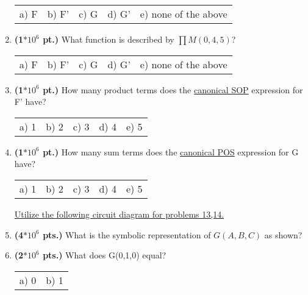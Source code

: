 \documentclass{article}
\begin{document}
\begin{enumerate}
\begin{tabular}{p{0.7in} p{0.7in} p{0.7in} p{0.7in} l}
a) F & b) F' & c) G & d) G' & e) none of the above
\end{tabular}

\item {\bf (1$*10^6$ pt.)} What function is described by $\prod M(0,4,5)$?

\begin{tabular}{p{0.7in} p{0.7in} p{0.7in} p{0.7in} l}
a) F & b) F' & c) G & d) G' & e) none of the above
\end{tabular}


\item {\bf (1$*10^6$ pt.)} How many product terms does the \underline{canonical SOP} expression 
for F' have?

\begin{tabular}{p{0.7in} p{0.7in} p{0.7in} p{0.7in} l}
a) 1 & b) 2 & c) 3 & d) 4 & e) 5
\end{tabular}

\item {\bf (1$*10^6$ pt.)} How many sum terms does the \underline{canonical POS} expression for G have?

\begin{tabular}{p{0.7in} p{0.7in} p{0.7in} p{0.7in} l}
a) 1 & b) 2 & c) 3 & d) 4 & e) 5
\end{tabular}
\pagebreak

\underline{Utilize the following circuit diagram for problems 13,14.}

\begin{figure}[ht]
\end{figure}

\item {\bf (4$*10^6$ pts.)} What is the symbolic representation of $G(A,B,C)$ as shown?

\item {\bf (2$*10^6$ pts.)} What does G(0,1,0) equal?

\begin{tabular}{p{0.7in} l}
a) 0 & b) 1 
\end{tabular}


\end{enumerate}
\end{document}
